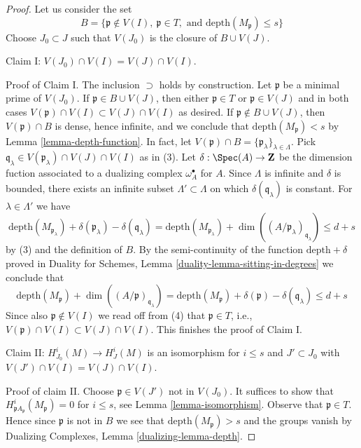 \begin{proof}
Let us consider the set
$$
B = \{\mathfrak p \not \in V(I),\ \mathfrak p \in T,\text{ and }
\text{depth}(M_\mathfrak p) \leq s\}
$$
Choose $J_0 \subset J$ such that $V(J_0)$ is the closure of $B \cup V(J)$.

\medskip\noindent
Claim I: $V(J_0) \cap V(I) = V(J) \cap V(I)$.

\medskip\noindent
Proof of Claim I. The inclusion $\supset$ holds by construction.
Let $\mathfrak p$ be a minimal prime of $V(J_0)$.
If $\mathfrak p \in B \cup V(J)$, then either $\mathfrak p \in T$
or $\mathfrak p \in V(J)$ and in both cases
$V(\mathfrak p) \cap V(I) \subset V(J) \cap V(I)$ as desired.
If $\mathfrak p \not \in B \cup V(J)$, then
$V(\mathfrak p) \cap B$ is dense, hence infinite, and we conclude that
$\text{depth}(M_\mathfrak p) < s$ by Lemma \ref{lemma-depth-function}.
In fact, let
$V(\mathfrak p) \cap B = \{\mathfrak p_\lambda\}_{\lambda \in \Lambda}$.
Pick $\mathfrak q_\lambda \in V(\mathfrak p_\lambda) \cap V(J) \cap V(I)$
as in (3).
Let $\delta : \Spec(A) \to \mathbf{Z}$ be the dimension fuction
associated to a dualizing complex $\omega_A^\bullet$ for $A$.
Since $\Lambda$ is infinite and $\delta$ is bounded,
there exists an infinite subset $\Lambda' \subset \Lambda$ on which
$\delta(\mathfrak q_\lambda)$ is constant. For
$\lambda \in \Lambda'$ we have
$$
\text{depth}(M_{\mathfrak p_\lambda}) +
\delta(\mathfrak p_\lambda) - \delta(\mathfrak q_\lambda) =
\text{depth}(M_{\mathfrak p_\lambda}) +
\dim((A/\mathfrak p_\lambda)_{\mathfrak q_\lambda})
\leq d + s
$$
by (3) and the definition of $B$. By the semi-continuity of
the function $\text{depth} + \delta$ proved in
Duality for Schemes, Lemma \ref{duality-lemma-sitting-in-degrees}
we conclude that
$$
\text{depth}(M_\mathfrak p) +
\dim((A/\mathfrak p)_{\mathfrak q_\lambda}) =
\text{depth}(M_\mathfrak p) + \delta(\mathfrak p) - \delta(\mathfrak q_\lambda)
\leq d + s
$$
Since also $\mathfrak p \not \in V(I)$ we read off from (4) that
$\mathfrak p \in T$, i.e.,
$V(\mathfrak p) \cap V(I) \subset V(J) \cap V(I)$. This finishes the
proof of Claim I.

\medskip\noindent
Claim II: $H^i_{J_0}(M) \to H^i_J(M)$ is an isomorphism for $i \leq s$
and $J' \subset J_0$ with $V(J') \cap V(I) = V(J) \cap V(I)$.

\medskip\noindent
Proof of claim II. Choose $\mathfrak p \in V(J')$ not in $V(J_0)$.
It suffices to show that $H^i_{\mathfrak pA_\mathfrak p}(M_\mathfrak p) = 0$
for $i \leq s$, see Lemma \ref{lemma-isomorphism}.
Observe that $\mathfrak p \in T$. Hence since $\mathfrak p$ is not in $B$
we see that $\text{depth}(M_\mathfrak p) > s$ and the groups vanish by
Dualizing Complexes, Lemma \ref{dualizing-lemma-depth}.


\end{proof}

